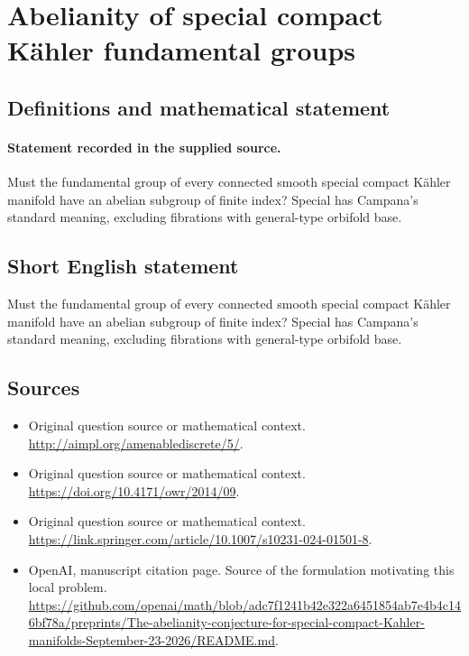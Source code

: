 \documentclass[11pt]{article}
\begin{document}
\section*{Abelianity of special compact Kähler fundamental groups}\label{30007018}
\subsection{Definitions and mathematical statement}
\paragraph{Statement recorded in the supplied source.}
Must the fundamental group of every connected smooth special compact Kähler manifold have an abelian subgroup of finite index? Special has Campana's standard meaning, excluding fibrations with general-type orbifold base.
\subsection{Short English statement}
Must the fundamental group of every connected smooth special compact Kähler manifold have an abelian subgroup of finite index? Special has Campana's standard meaning, excluding fibrations with general-type orbifold base.
\subsection{Sources}
\begin{itemize}
\item[S1] Original question source or mathematical context.
\url{http://aimpl.org/amenablediscrete/5/}.
\item[S2] Original question source or mathematical context.
\url{https://doi.org/10.4171/owr/2014/09}.
\item[S3] Original question source or mathematical context.
\url{https://link.springer.com/article/10.1007/s10231-024-01501-8}.
\item[S4] OpenAI, manuscript citation page. Source of the formulation motivating this local problem.
\url{https://github.com/openai/math/blob/adc7f1241b42e322a6451854ab7e4b4c146bf78a/preprints/The-abelianity-conjecture-for-special-compact-Kahler-manifolds-September-23-2026/README.md}.
\end{itemize}
\end{document}
